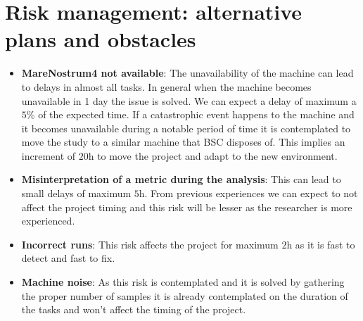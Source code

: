 \section{Risk management: alternative plans and obstacles}

\begin{itemize}
  \item \textbf{MareNostrum4 not available}: The unavailability of the machine can lead to delays in almost all tasks. In general when the machine becomes unavailable in 1 day the issue is solved. We can expect a delay of maximum a $5\%$ of the expected time. If a catastrophic event happens to the machine and it becomes unavailable during a notable period of time it is contemplated to move the study to a similar machine that BSC disposes of. This implies an increment of $\si{20\hour}$ to move the project and adapt to the new environment.

  \item \textbf{Misinterpretation of a metric during the analysis}: This can lead to small delays of maximum $\si{5\hour}$. From previous experiences we can expect to not affect the project timing and this risk will be lesser as the researcher is more experienced.

  \item \textbf{Incorrect runs}: This risk affects the project for maximum $\si{2\hour}$ as it is fast to detect and fast to fix.

  \item \textbf{Machine noise}: As this risk is contemplated and it is solved by gathering the proper number of samples it is already contemplated on the duration of the tasks and won't affect the timing of the project.  
\end{itemize}
